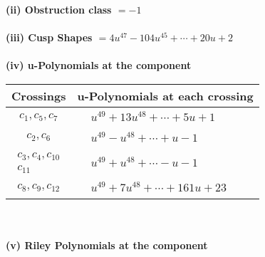 \documentclass[1p]{elsarticle_modified}
\theoremstyle{definition}
\begin{document}
\flushleft \textbf{(ii) Obstruction class $= -1$}\\~\\
\flushleft \textbf{(iii) Cusp Shapes $= 4 u^{47}-104 u^{45}+\cdots+20 u+2$}\\~\\
\newpage\renewcommand{\arraystretch}{1}
\flushleft \textbf{(iv) u-Polynomials at the component}\newline \\
\begin{tabular}{m{50pt}|m{274pt}}
Crossings & \hspace{64pt}u-Polynomials at each crossing \\
\hline $$\begin{aligned}c_{1},c_{5},c_{7}\end{aligned}$$&$\begin{aligned}
&u^{49}+13 u^{48}+\cdots+5 u+1
\end{aligned}$\\
\hline $$\begin{aligned}c_{2},c_{6}\end{aligned}$$&$\begin{aligned}
&u^{49}- u^{48}+\cdots+u-1
\end{aligned}$\\
\hline $$\begin{aligned}c_{3},c_{4},c_{10}\\c_{11}\end{aligned}$$&$\begin{aligned}
&u^{49}+u^{48}+\cdots- u-1
\end{aligned}$\\
\hline $$\begin{aligned}c_{8},c_{9},c_{12}\end{aligned}$$&$\begin{aligned}
&u^{49}+7 u^{48}+\cdots+161 u+23
\end{aligned}$\\
\hline
\end{tabular}\\~\\
\newpage\renewcommand{\arraystretch}{1}
\flushleft \textbf{(v) Riley Polynomials at the component}\newline \\
\end{document}

